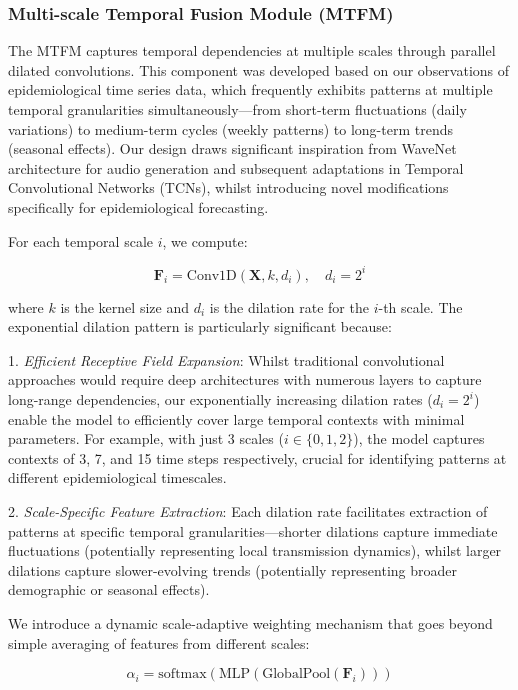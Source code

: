 \documentclass[lettersize, journal]{IEEEtran}
\begin{document}
\subsubsection{Multi-scale Temporal Fusion Module (MTFM)}
The MTFM captures temporal dependencies at multiple scales through parallel dilated convolutions. This component was developed based on our observations of epidemiological time series data, which frequently exhibits patterns at multiple temporal granularities simultaneously—from short-term fluctuations (daily variations) to medium-term cycles (weekly patterns) to long-term trends (seasonal effects). Our design draws significant inspiration from WaveNet architecture for audio generation and subsequent adaptations in Temporal Convolutional Networks (TCNs), whilst introducing novel modifications specifically for epidemiological forecasting.

For each temporal scale $i$, we compute:

\begin{equation}
\mathbf{F}_i = \text{Conv1D}(\mathbf{X}, k, d_i), \quad d_i = 2^i
\end{equation}

where $k$ is the kernel size and $d_i$ is the dilation rate for the $i$-th scale. The exponential dilation pattern is particularly significant because:

1. \textit{Efficient Receptive Field Expansion}: Whilst traditional convolutional approaches would require deep architectures with numerous layers to capture long-range dependencies, our exponentially increasing dilation rates ($d_i = 2^i$) enable the model to efficiently cover large temporal contexts with minimal parameters. For example, with just 3 scales ($i \in \{0,1,2\}$), the model captures contexts of 3, 7, and 15 time steps respectively, crucial for identifying patterns at different epidemiological timescales.

2. \textit{Scale-Specific Feature Extraction}: Each dilation rate facilitates extraction of patterns at specific temporal granularities—shorter dilations capture immediate fluctuations (potentially representing local transmission dynamics), whilst larger dilations capture slower-evolving trends (potentially representing broader demographic or seasonal effects).

We introduce a dynamic scale-adaptive weighting mechanism that goes beyond simple averaging of features from different scales:

\begin{equation}
\alpha_i = \text{softmax}(\text{MLP}(\text{GlobalPool}(\mathbf{F}_i)))
\end{equation}
\end{document}
